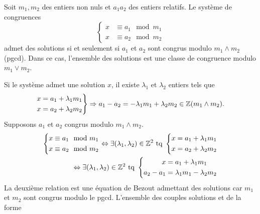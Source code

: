 \begin{propn}
  Soit $m_1, m_2$ des entiers non nuls et $a_1 a_2$ des entiers relatifs. Le système de congruences
  \begin{displaymath}
    \left\lbrace
      \begin{align*}
        x &\equiv a_1 \mod m_1 \\
        x &\equiv a_2 \mod m_2
      \end{align*}
    \right.
  \end{displaymath}
  admet des solutions si et seulement si $a_1$ et $a_2$ sont congrus modulo $m_1 \wedge m_2$ (pgcd). Dans ce cas, l'ensemble des solutions est une classe de congruence modulo $m_1 \vee m_2$.
\end{propn}
\begin{demo}
  Si le système admet une solution $x$, il existe $\lambda_1$ et $\lambda_2$ entiers tels que
  \begin{displaymath}
    \left.
    \begin{aligned}
      x &= a_1 + \lambda_1 m_1 \\
      x &= a_2 + \lambda_2 m_2
    \end{aligned}
    \right \rbrace \Rightarrow
    a_1 - a_2 = -\lambda_1 m_1 + \lambda_2 m_2 \in \mathbb{Z} (m_1 \wedge m_2).
  \end{displaymath}
  Supposons $a_1$ et $a_2$ congrus modulo $m_1 \wedge m_2$.
  \begin{align*}
        \left\lbrace
      \begin{aligned}
        x &\equiv a_1 \mod m_1 \\
        x &\equiv a_2 \mod m_2
      \end{aligned}
    \right.
    \Leftrightarrow \exists (\lambda_1, \lambda_2) \in \mathbb{Z}^2 \text{ tq }
            \left\lbrace
      \begin{aligned}
        x &= a_1 + \lambda_1 m_1 \\
        x &= a_2 + \lambda_2 m_2
      \end{aligned}
    \right. \\
    \Leftrightarrow \exists (\lambda_1, \lambda_2) \in \mathbb{Z}^2 \text{ tq }
            \left\lbrace
      \begin{aligned}
        x &= a_1 + \lambda_1 m_1 \\
        a_2 - a_1 &= \lambda_1 m_1 - \lambda_2 m_2
      \end{aligned}
    \right.
  \end{align*}
  La deuxième relation est une équation de Bezout admettant des solutions car $m_1$ et $m_2$ sont congrus modulo le pgcd. L'ensemble des couples solutions et de la forme

\end{demo}

